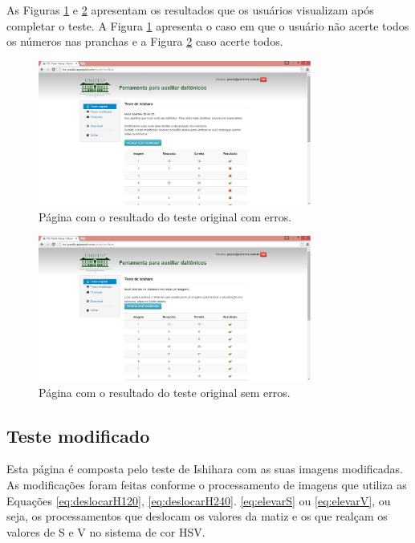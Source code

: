 \documentclass[	12pt, Times, openright, twoside, a4paper, english, brazil]{abntex2}
\begin{document}
As Figuras \ref{fig:telaResultadoOriginalErro} e \ref{fig:telaResultadoOriginal} apresentam os resultados que os usuários visualizam após completar o teste. A Figura \ref{fig:telaResultadoOriginalErro} apresenta o caso em que o usuário não acerte todos os números nas pranchas e a Figura \ref{fig:telaResultadoOriginal} caso acerte todos.

\begin{figure}[!htb]
\centering \includegraphics[width=0.8\textwidth]{telaResultadoOriginalErro.jpg}
\caption{Página com o resultado do teste original com erros.} \label{fig:telaResultadoOriginalErro}
\end{figure}

\begin{figure}[!htb]
\centering \includegraphics[width=0.8\textwidth]{telaResultadoOriginal.jpg}
\caption{Página com o resultado do teste original sem erros.} \label{fig:telaResultadoOriginal}
\end{figure}


\subsection{Teste modificado}
\label{subsec:testeModificado}

Esta página é composta pelo teste de Ishihara com as suas imagens modificadas. As modificações foram feitas conforme o processamento de imagens que utiliza as Equações \ref{eq:deslocarH120}, \ref{eq:deslocarH240}. \ref{eq:elevarS} ou \ref{eq:elevarV}, ou seja, os processamentos que deslocam os valores da matiz e os que realçam os valores de S e V no sistema de cor HSV.
\end{document}
